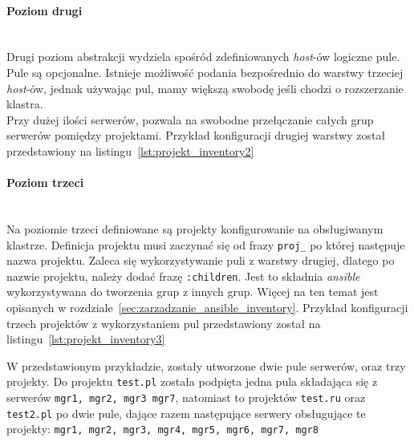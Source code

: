\paragraph*{Poziom drugi}~\\
Drugi poziom abstrakcji wydziela spośród zdefiniowanych \textit{host}-ów logiczne pule.
Pule są opcjonalne.
Istnieje możliwość podania bezpośrednio do warstwy trzeciej \textit{host}-ów, jednak używając pul, mamy większą swobodę jeśli chodzi o rozszerzanie klastra.\\
Przy dużej ilości serwerów, pozwala na swobodne przełączanie całych grup serwerów pomiędzy projektami.
Przykład konfiguracji drugiej warstwy został przedstawiony na listingu~\ref{lst:projekt_inventory2}

\paragraph*{Poziom trzeci}~\\
Na poziomie trzeci definiowane są projekty konfigurowanie na obsługiwanym klastrze.
Definicja projektu musi zaczynać się od frazy \texttt{proj\_} po której następuje nazwa projektu.
Zaleca się wykorzystywanie puli z warstwy drugiej, dlatego po nazwie projektu, należy dodać frazę \texttt{:children}.
Jest to składnia \textit{ansible} wykorzystywana do tworzenia grup z innych grup.
Więcej na ten temat jest opisanych w rozdziale~\ref{sec:zarzadzanie_ansible_inventory}.
Przykład konfiguracji trzech projektów z wykorzystaniem pul przedstawiony został na listingu~\ref{lst:projekt_inventory3}


W przedstawionym przykładzie, zostały utworzone dwie pule serwerów, oraz trzy projekty.
Do projektu \texttt{test.pl} została podpięta jedna pula składająca się z serwerów \texttt{mgr1, mgr2, mgr3 mgr7}, natomiast to projektów \texttt{test.ru} oraz \texttt{test2.pl} po dwie pule, dające razem następujące serwery obsługujące te projekty: \texttt{mgr1, mgr2, mgr3, mgr4, mgr5, mgr6, mgr7, mgr8}
